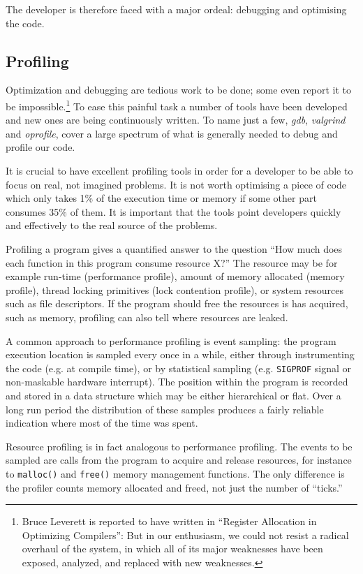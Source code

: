 \documentclass[10pt,a4paper,twocolumn]{article}
\begin{document}
The developer is therefore faced with a major ordeal: debugging and
optimising the code.

\subsection{Profiling}

Optimization and debugging are tedious work to be done; some even
report it to be impossible.\footnote{Bruce Leverett is reported to
have written in ``Register Allocation in Optimizing Compilers'': But
in our enthusiasm, we could not resist a radical overhaul of the
system, in which all of its major weaknesses have been exposed,
analyzed, and replaced with new weaknesses.}  To ease this painful
task a number of tools have been developed and new ones are being
continuously written.  To name just a few, {\em gdb}, {\em valgrind}
and {\em oprofile}, cover a large spectrum of what is generally needed
to debug and profile our code.

It is crucial to have excellent profiling tools in order for a
developer to be able to focus on real, not imagined problems.  It is
not worth optimising a piece of code which only takes 1\% of the
execution time or memory if some other part consumes 35\% of them.
It is important that the tools point developers quickly and
effectively to the real source of the problems.

Profiling a program gives a quantified answer to the question ``How
much does each function in this program consume resource X?''  The
resource may be for example run-time (performance profile), amount of
memory allocated (memory profile), thread locking primitives (lock
contention profile), or system resources such as file descriptors.  If
the program should free the resources is has acquired, such as memory,
profiling can also tell where resources are leaked.

A common approach to performance profiling is event sampling: the
program execution location is sampled every once in a while, either
through instrumenting the code (e.g. at compile time), or by
statistical sampling (e.g. \verb|SIGPROF| signal or non-maskable
hardware interrupt).  The position within the program is recorded and
stored in a data structure which may be either hierarchical or flat.
Over a long run period the distribution of these samples produces a
fairly reliable indication where most of the time was spent.

Resource profiling is in fact analogous to performance profiling.  The
events to be sampled are calls from the program to acquire and release
resources, for instance to \verb|malloc()| and \verb|free()| memory
management functions.  The only difference is the profiler counts
memory allocated and freed, not just the number of ``ticks.''
\end{document}
